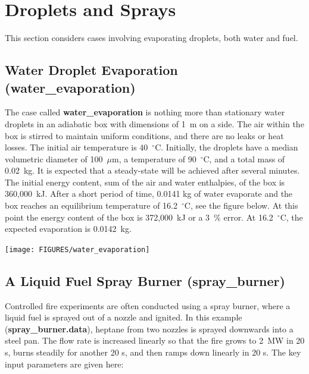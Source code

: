 \documentclass[11pt]{book}
\begin{document}
\clearpage

\section{Droplets and Sprays}

This section considers cases involving evaporating droplets, both water and fuel.


\subsection{Water Droplet Evaporation ({\bf water\_evaporation}) }

The case called {\bf water\_evaporation} is nothing more than stationary water droplets in an adiabatic box with dimensions of 1~m on a side. The air
within the box is stirred to maintain uniform conditions, and there are no leaks or heat losses. The initial air
 temperature is 40~$^\circ$C.
Initially, the droplets have a median volumetric diameter of 100~$\mu$m, a temperature of 90~$^\circ$C, and a total mass of 0.02~kg.
It is expected that a steady-state will be achieved after several minutes.  The initial energy content, sum of the
air and water enthalpies, of the box is 360,000~kJ.  After a short period of time, 0.0141 kg of water evaporate and the box
reaches an equilibrium temperature of 16.2~$^\circ$C, see the figure below.  At this point the energy content of the box is 372,000~kJ
 or a 3~\% error.  At 16.2~$^\circ$C, the expected evaporation is 0.0142~kg.

\begin{center}
\texttt{[image: FIGURES/water\_evaporation]}
\end{center}







\clearpage

\subsection{A Liquid Fuel Spray Burner ({\bf spray\_burner}) }

Controlled fire experiments are often conducted using a spray burner,
where a liquid fuel is sprayed out of a nozzle and ignited. In this
example ({\bf spray\_burner.data}), heptane from two nozzles is
sprayed downwards into a steel pan.  The flow rate is increased
linearly so that the fire grows to 2~MW in 20 s, burns steadily for
another 20 s, and then ramps down linearly in 20 s. The key input
parameters are given here:
\end{document}
